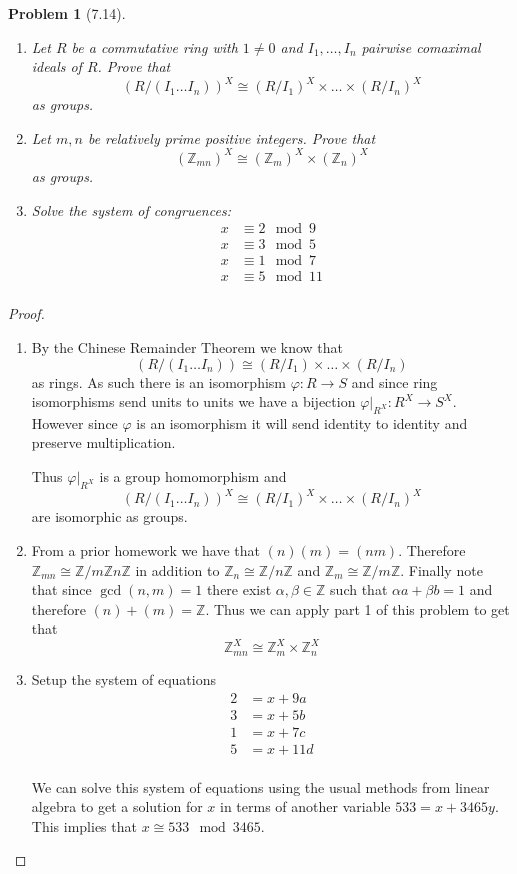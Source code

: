\documentclass[10pt]{article}
\newcommand{\bb}[1]{\mathbb{#1}}
\theoremstyle{plain}
\newtheorem{problem}{Problem}
\theoremstyle{remark}
\begin{document}
\begin{problem}[7.14]
  \begin{enumerate}
  \item Let $R$ be a commutative ring with $1\neq 0$ and $I_1,\ldots,I_n$
    pairwise comaximal ideals of $R$. Prove that
    \[ (R/(I_1\ldots I_n))^X\cong (R/I_1)^X\times\ldots\times(R/I_n)^X \]
    as groups.
  \item Let $m,n$ be relatively prime positive integers. Prove that
    \[ (\bb{Z}_{mn})^X\cong (\bb{Z}_m)^X\times(\bb{Z}_n)^X \]
    as groups.
  \item Solve the system of congruences:
    \begin{align*}
      x &\equiv 2 \mod 9\\
      x &\equiv 3 \mod 5\\
      x &\equiv 1 \mod 7\\
      x &\equiv 5 \mod 11\\
    \end{align*}
  \end{enumerate}
\end{problem}

\begin{proof}
  \begin{enumerate}
  \item By the Chinese Remainder Theorem we know that
    \[(R/(I_1\ldots I_n))\cong (R/I_1)\times\ldots\times(R/I_n) \]
    as rings. As such there is an isomorphism
    $\varphi:R\rightarrow S$ and since ring isomorphisms send units to units we have
    a bijection $\varphi|_{R^X}:R^X\rightarrow S^X$. However since $\varphi$ is an isomorphism
    it will send identity to identity and preserve multiplication.

    Thus $\varphi|_{R^X}$ is a group homomorphism and
    \[ (R/(I_1\ldots I_n))^X\cong (R/I_1)^X\times\ldots\times(R/I_n)^X \]
    are isomorphic as groups.
    
  \item From a prior homework we have that $(n)(m)=(nm)$. Therefore
    $\bb{Z}_{mn}\cong \bb{Z}/m\bb{Z}n\bb{Z}$ in addition to
    $\bb{Z}_n\cong\bb{Z}/n\bb{Z}$ and $\bb{Z}_m\cong \bb{Z}/m\bb{Z}$.
    Finally note that since $\gcd(n,m)=1$ there exist $\alpha,\beta\in\bb{Z}$
    such that $\alpha a+\beta b = 1$ and therefore $(n)+(m)=\bb{Z}$. Thus
    we can apply part 1 of this problem to get that
    \[ \bb{Z}_{mn}^X\cong\bb{Z}_m^X\times\bb{Z}_n^X \]
  \item Setup the system of equations
    \begin{align*}
      2 &= x+9a\\
      3 &= x+5b\\
      1 &= x+7c\\
      5 &= x+11d\\
    \end{align*}

    We can solve this system of equations using the usual methods from
    linear algebra to get a solution for $x$
    in terms of another variable $533 = x + 3465y$. This implies that
    $x\cong 533 \mod 3465$.
  \end{enumerate}
\end{proof}
\end{document}

